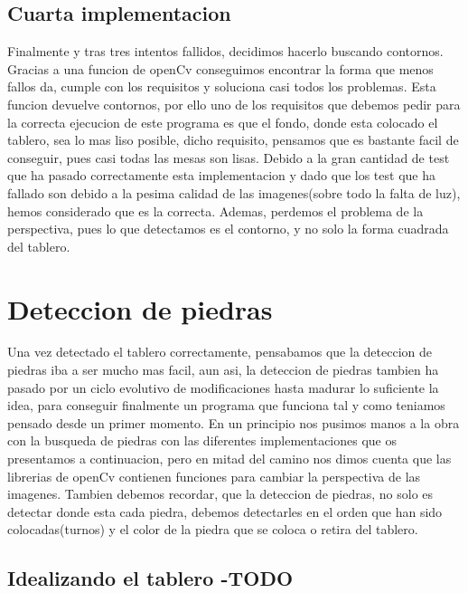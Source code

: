 \documentclass[12pt,a4paper]{report}
\begin{document}
\subsection{Cuarta implementacion}

Finalmente y tras tres intentos fallidos, decidimos hacerlo buscando contornos. Gracias a una funcion de openCv conseguimos encontrar la forma que menos fallos da, cumple con los requisitos y soluciona casi todos los problemas.
Esta funcion devuelve contornos, por ello uno de los requisitos que debemos pedir para la correcta ejecucion de este programa es que el fondo, donde esta colocado el tablero, sea lo mas liso posible, dicho requisito, pensamos que es bastante facil de conseguir, pues casi todas las mesas son lisas.
Debido a la gran cantidad de test que ha pasado correctamente esta implementacion y dado que los test que ha fallado son debido a la pesima calidad de las imagenes(sobre todo la falta de luz), hemos considerado que es la correcta. Ademas, perdemos el problema de la perspectiva, pues lo que detectamos es el contorno, y no solo la forma cuadrada del tablero.

\section{Deteccion de piedras}
Una vez detectado el tablero correctamente, pensabamos que la deteccion de piedras iba a ser mucho mas facil, aun asi, la deteccion de piedras tambien ha pasado por un ciclo evolutivo de modificaciones hasta madurar lo suficiente la idea, para conseguir finalmente un programa que funciona tal y como teniamos pensado desde un primer momento.
En un principio nos pusimos manos a la obra con la busqueda de piedras con las diferentes implementaciones que os presentamos a continuacion, pero en mitad del camino nos dimos cuenta que las librerias de openCv contienen funciones para cambiar la perspectiva de las imagenes.
Tambien debemos recordar, que la deteccion de piedras, no solo es detectar donde esta cada piedra, debemos detectarles en el orden que han sido colocadas(turnos) y el color de la piedra que se coloca o retira del tablero.

\subsection{Idealizando el tablero -TODO}%
\end{document}
